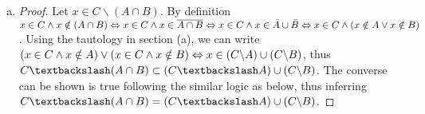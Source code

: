\begin{question}
\begin{ans}
\begin{enumerate}[(a)]
			\item \begin{proof}
			Let $x \in C \backslash (A \cap B)$. By definition $x \in C \wedge x \notin (A \cap B) \Leftrightarrow x \in C \wedge x \in \overline{A \cap B} \Leftrightarrow x \in C \wedge x \in \bar{A} \cup \bar{B} \Leftrightarrow x \in C \wedge (x \notin A \vee x \notin B)$. Using the tautology in section (a),
			we can write $(x \in C \wedge x \notin A) \vee (x \in C \wedge x \notin B) \Leftrightarrow x \in (C \backslash A) \cup (C \backslash B) $, thus $C \textbackslash (A \cap B) \subset (C \textbackslash A) \cup (C \backslash B)$. The converse can be shown is true following the similar logic as below, thus inferring $C \textbackslash (A \cap B) = (C \textbackslash A) \cup (C \backslash B)$.
			\end{proof}
			
			
			
			
		\end{enumerate}
	\end{ans}
\end{question}